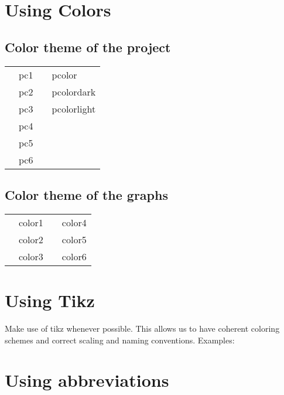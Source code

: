 \section{Using Colors}
\subsection{Color theme of the project}
\begin{tabular}{ll@{\hskip 4cm}l l}
      \cellcolor{pc1}\phantom{some} &  pc1&\cellcolor{pcolor}\phantom{some} &  pcolor\\
     \cellcolor{pc2}\phantom{some} &  pc2& \cellcolor{pcolordark}\phantom{some} &  pcolordark\\
     \cellcolor{pc3}\phantom{some} &  pc3 & \cellcolor{pcolorlight}\phantom{some} &  pcolorlight\\
     \cellcolor{pc4}\phantom{some} &  pc4\\ 
     \cellcolor{pc5}\phantom{some} &  pc5\\
     \cellcolor{pc6}\phantom{some} &  pc6\\     
\end{tabular}

\subsection{Color theme of the graphs}
\begin{tabular}{ll@{\hskip 4cm}l l}
      \cellcolor{color1}\phantom{some} &  color1&\cellcolor{color4}\phantom{some} &  color4\\
     \cellcolor{color2}\phantom{some} &  color2& \cellcolor{color5}\phantom{some} &  color5\\
     \cellcolor{color3}\phantom{some} & color3 & \cellcolor{color6}\phantom{some} &  color6\\
\end{tabular}


\section{Using Tikz}
Make use of tikz whenever possible. This allows us to have coherent coloring schemes and correct scaling and naming conventions. Examples:

\begin{figure}[h]
    \centering
    \setlength{\figurewidth}{0.8\linewidth}
    \setlength{\figureheight}{0.3\linewidth}
    
\end{figure}

\begin{figure}[h]
    \centering
    \setlength{\figurewidth}{0.6\linewidth}
    \setlength{\figureheight}{0.3\linewidth}
    
\end{figure}

\FloatBarrier%
\section{Using abbreviations}











